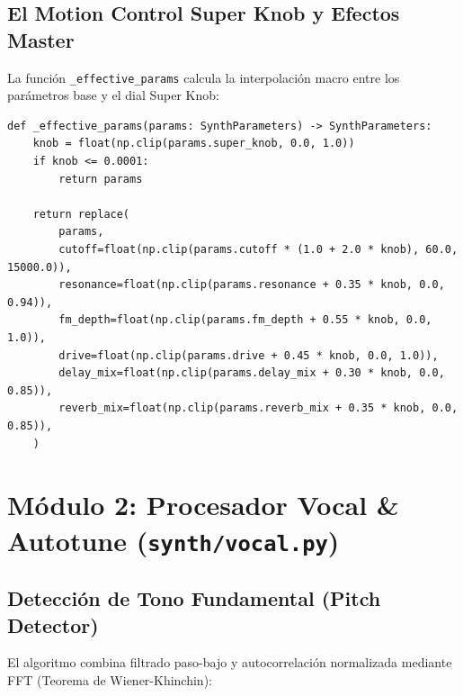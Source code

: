 \documentclass[11pt,a4paper]{article}
\begin{document}
\subsection{El Motion Control Super Knob y Efectos Master}
La función \texttt{\_effective\_params} calcula la interpolación macro entre los parámetros base y el dial Super Knob:

\begin{lstlisting}
def _effective_params(params: SynthParameters) -> SynthParameters:
    knob = float(np.clip(params.super_knob, 0.0, 1.0))
    if knob <= 0.0001:
        return params

    return replace(
        params,
        cutoff=float(np.clip(params.cutoff * (1.0 + 2.0 * knob), 60.0, 15000.0)),
        resonance=float(np.clip(params.resonance + 0.35 * knob, 0.0, 0.94)),
        fm_depth=float(np.clip(params.fm_depth + 0.55 * knob, 0.0, 1.0)),
        drive=float(np.clip(params.drive + 0.45 * knob, 0.0, 1.0)),
        delay_mix=float(np.clip(params.delay_mix + 0.30 * knob, 0.0, 0.85)),
        reverb_mix=float(np.clip(params.reverb_mix + 0.35 * knob, 0.0, 0.85)),
    )
\end{lstlisting}

\section{Módulo 2: Procesador Vocal \& Autotune (\texttt{synth/vocal.py})}

\subsection{Detección de Tono Fundamental (Pitch Detector)}
El algoritmo combina filtrado paso-bajo y autocorrelación normalizada mediante FFT (Teorema de Wiener-Khinchin):
\end{document}
